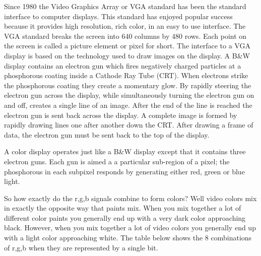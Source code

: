 Since 1980 the Video Graphics Array or VGA standard has been the 
standard interface to computer displays. This standard has enjoyed 
popular success because it provides high resolution, rich color, 
in an easy to use interface. The VGA standard breaks the screen 
into 640 columns by 480 rows. Each point on the screen is called a 
picture element or pixel for short. The interface to a VGA display 
is based on the technology used to draw images on the display. A 
B\&W display contains an electron gun which fires negatively charged 
particles at a phosphorous coating inside a Cathode Ray Tube (CRT). 
When electrons strike the phosphorous coating they create a momentary 
glow. By rapidly steering the electron gun across the display, while 
simultaneously turning the electron gun on and off, creates a single 
line of an image. After the end of the line is reached the electron 
gun is sent back across the display. A complete image is formed by 
rapidly drawing lines one after another down the CRT. After drawing 
a frame of data, the electron gun must be sent back to the top of the 
display.

A color display operates just like a B\&W display except that it contains 
three electron guns. Each gun is aimed a a particular sub-region of a 
pixel; the phosphorous in each subpixel responds by generating either 
red, green or blue light.

So how exactly do the r,g,b signals combine to form colors? Well 
video colors mix in exactly the opposite way that paints mix. When 
you mix together a lot of different color paints you generally end 
up with a very dark color approaching black. However, when you mix 
together a lot of video colors you generally end up with a light 
color approaching white. The table below shows the 8 combinations 
of r,g,b when they are represented by a single bit.

\begin{table}[ht]
\end{table}

